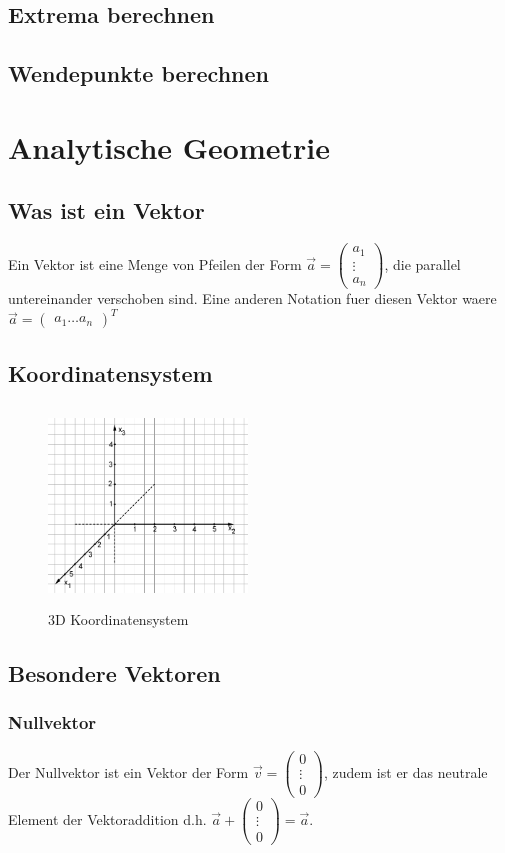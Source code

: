 \documentclass[a4paper]{article} %
\begin{document}
	\subsection{Extrema berechnen}
	\subsection{Wendepunkte berechnen}
	\section{Analytische Geometrie}
	\subsection{Was ist ein Vektor}
	Ein Vektor ist eine Menge von Pfeilen der Form $\vec{a} = \begin{pmatrix} a_1 \\ \vdots \\ a_n \end{pmatrix} $, die parallel untereinander verschoben sind.
	Eine anderen Notation fuer diesen Vektor waere $\vec{a} = \begin{pmatrix} a_1  \hdots  a_n \end{pmatrix}^T $
	\subsection{Koordinatensystem}
	\begin{minipage}{0.5\textwidth}
			\begin{figure}[H]
				\includegraphics[width=200px, height=200px]{koordinatensystem.png}
					\captionsetup{labelformat=empty}
				\caption{3D Koordinatensystem}
			\end{figure}
		\end{minipage} 
	\subsection{Besondere Vektoren}
	\subsubsection{Nullvektor}
	Der Nullvektor ist ein Vektor der Form $\vec{v} = \begin{pmatrix} 0 \\ \vdots \\ 0 \end{pmatrix}$, 
	 zudem ist er das neutrale Element der Vektoraddition d.h. $ \vec{a} + \begin{pmatrix} 0 \\ \vdots \\ 0 \end{pmatrix} = \vec{a}$.
\end{document}
